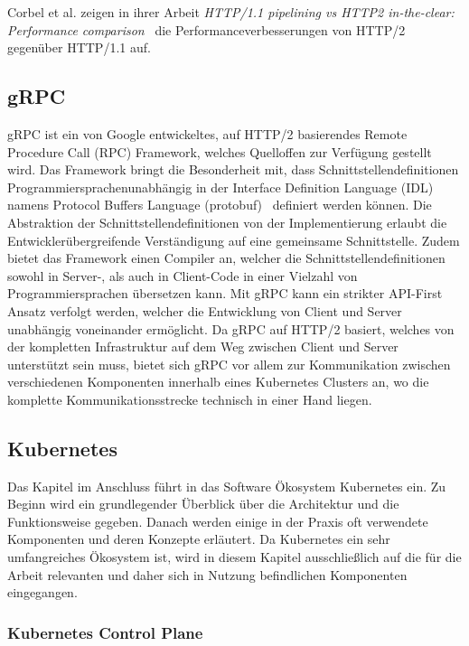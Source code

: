 Corbel et al. zeigen in ihrer Arbeit \textit{HTTP/1.1 pipelining vs HTTP2 in-the-clear: Performance comparison}~\cite{7745823} die Performanceverbesserungen von HTTP/2 gegenüber HTTP/1.1 auf.

\subsection{gRPC}\label{subsec:grpc}
gRPC ist ein von Google entwickeltes, auf HTTP/2 basierendes Remote Procedure Call (RPC) Framework, welches Quelloffen zur Verfügung gestellt wird.
Das Framework bringt die Besonderheit mit, dass Schnittstellendefinitionen Programmiersprachenunabhängig in der Interface Definition Language (IDL) namens Protocol Buffers Language (protobuf)~\cite{protobuf} definiert werden können.
Die Abstraktion der Schnittstellendefinitionen von der Implementierung erlaubt die Entwicklerübergreifende Verständigung auf eine gemeinsame Schnittstelle.
Zudem bietet das Framework einen Compiler an, welcher die Schnittstellendefinitionen sowohl in Server-, als auch in Client-Code in einer Vielzahl von Programmiersprachen übersetzen kann.
Mit gRPC kann ein strikter API-First Ansatz verfolgt werden, welcher die Entwicklung von Client und Server unabhängig voneinander ermöglicht.
Da gRPC auf HTTP/2 basiert, welches von der kompletten Infrastruktur auf dem Weg zwischen Client und Server unterstützt sein muss, bietet sich gRPC vor allem zur Kommunikation zwischen verschiedenen Komponenten innerhalb eines Kubernetes Clusters an, wo die komplette Kommunikationsstrecke technisch in einer Hand liegen.

\subsection{Kubernetes}\label{subsec:kubernetes}
Das Kapitel im Anschluss führt in das Software Ökosystem Kubernetes ein.
Zu Beginn wird ein grundlegender Überblick über die Architektur und die Funktionsweise gegeben.
Danach werden einige in der Praxis oft verwendete Komponenten und deren Konzepte erläutert.
Da Kubernetes ein sehr umfangreiches Ökosystem ist, wird in diesem Kapitel ausschließlich auf die für die Arbeit relevanten und daher sich in Nutzung befindlichen Komponenten eingegangen.

\subsubsection{Kubernetes Control Plane}


